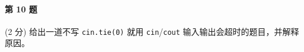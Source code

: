 \paragraph{第 10 题} (2 分) 给出一道不写 \lstinline{cin.tie(0)}
就用 \lstinline{cin}/\lstinline{cout} 输入输出会超时的题目，并解释原因。

\quad \\[1cm]
